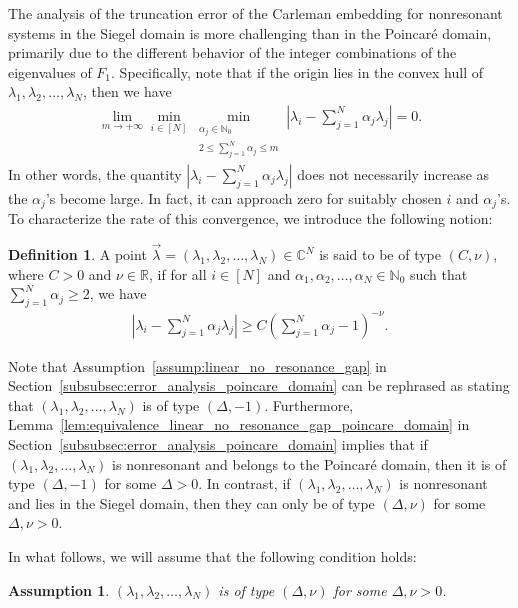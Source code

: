 \documentclass[superscriptaddress,onecolumn,nofootinbib,longbibliography,a4paper,accepted=2026-09-29]{quantumarticle}
\theoremstyle{plain}
\newtheorem{assumption}[thm]{Assumption}
\theoremstyle{definition}
\newtheorem{definition}[thm]{Definition}
\numberwithin{thm}{section}
\numberwithin{assumption}{section}
\numberwithin{lemma}{section}
\numberwithin{prop}{section}
\numberwithin{cor}{section}
\numberwithin{definition}{section}
\numberwithin{rmk}{section}
\numberwithin{equation}{section}
\newcommand{\abs}[1]      {\left| #1 \right|}
\newcommand{\R}{\mathbb{R}}
\newcommand{\myC}{\mathbb{C}}
\newcommand{\myN}{\mathbb{N}}
\newcommand{\lrb}[1]{\left ( #1 \right )}
\begin{document}
The analysis of the truncation error of the Carleman embedding for nonresonant systems in the Siegel domain is more challenging than in the Poincar\'{e} domain, primarily due to the different behavior of the integer combinations of the eigenvalues of $F_1$. Specifically, note that if the origin lies in the convex hull of $\lambda_1, \lambda_2, \dots, \lambda_N$, then we have
\begin{align}
    \lim_{m \to +\infty} \min_{i \in [N]} \min_{\substack{\alpha_j \in \myN_0 \\ 2 \le \sum_{j=1}^N  \alpha_j \le m}} \abs{\lambda_i-\sum_{j=1}^N \alpha_j\lambda_j} = 0.
\end{align}
In other words, the quantity $\abs{\lambda_i-\sum_{j=1}^N \alpha_j\lambda_j}$ does not necessarily increase as the $\alpha_j$'s become large. In fact, it can approach zero for suitably chosen $i$ and $\alpha_j$'s. To characterize the rate of this convergence, we introduce the following notion:

\begin{definition}
    A point $\vec \lambda=(\lambda_1, \lambda_2, \dots, \lambda_N) \in \myC^N$ is said to be of type $(C, \nu)$, where $C>0$ and $\nu \in \R$, if for all $i \in [N]$ and $\alpha_1, \alpha_2, \dots, \alpha_N \in \myN_0$ such that $\sum_{j=1}^N \alpha_j \ge 2$,
    we have
    \begin{align}
        \abs{\lambda_i - \sum_{j=1}^N \alpha_j \lambda_j} \ge C \lrb{\sum_{j=1}^N \alpha_j - 1}^{-\nu}.
    \end{align}    
\end{definition}

Note that Assumption~\ref{assump:linear_no_resonance_gap} in Section~\ref{subsubsec:error_analysis_poincare_domain} can be rephrased as stating that $(\lambda_1, \lambda_2, \dots, \lambda_N)$ is of type $(\Delta, -1)$. Furthermore, Lemma~\ref{lem:equivalence_linear_no_resonance_gap_poincare_domain} in Section~\ref{subsubsec:error_analysis_poincare_domain} implies that if $(\lambda_1, \lambda_2, \dots, \lambda_N)$ is nonresonant and belongs to the Poincar\'{e} domain, then it is of type $(\Delta, -1)$ for some $\Delta > 0$. In contrast, if 
$(\lambda_1, \lambda_2, \dots, \lambda_N)$ is nonresonant and lies in the Siegel domain, then they can only be of type $(\Delta, \nu)$ for some
$\Delta, \nu > 0$.

In what follows, we will assume that the following condition holds:
\begin{assumption}
   $(\lambda_1, \lambda_2, \dots, \lambda_N)$ is of type $(\Delta, \nu)$ for some $\Delta, \nu > 0$. 
   \label{assump:gap_condition_siegel_domain}
\end{assumption}
\end{document}
